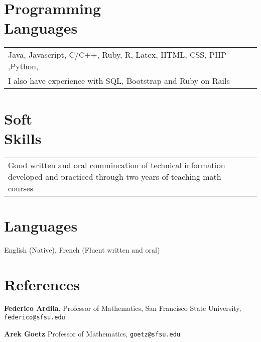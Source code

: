 \documentclass[margin,line,pifont,palatino,courier]{res}
\begin{document}
\begin{resume}
\begin{tabular}{@{}p{0.75in}p{0.5in}p{4in}}
\end{tabular}


\section{\sc Programming\\ Languages}

\begin{tabular}{@{}p{6in}p{3in}}

Java, Javascript,  C/C++, Ruby, R, Latex, HTML, CSS, PHP ,Python,\\
I also have experience with SQL, Bootstrap and Ruby on Rails


\end{tabular}

\section{\sc  Soft\\Skills}

\begin{tabular}{@{}p{6in}p{3in}}
Good written and oral commincation of technical information developed and practiced through two years of teaching math courses  \\


\end{tabular}

\section{\sc  Languages}
  English (Native), French (Fluent written and oral)


\section{\sc   References}
{\bf Federico Ardila}, Professor of Mathematics, San Francisco State University, \\
\texttt{federico@sfsu.edu}

{\bf Arek Goetz} Professor of Mathematics, 
  \texttt{goetz@sfsu.edu} 
  
  \newpage
\end{resume}
\end{document}
